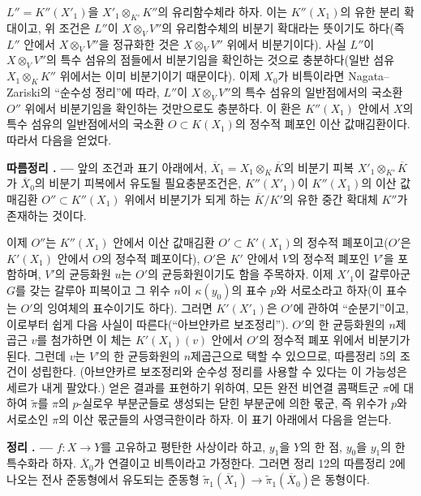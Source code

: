 \documentclass[11pt,twoside,openany]{book}
\numberwithin{equation}{section}
\newcommand{\sourceunit}{front}
\newcommand{\src}[1]{%
  \phantomsection\hypertarget{src:\sourceunit:#1}{}%
  \marginpar{\raggedleft\footnotesize\sffamily #1}%
}
\theoremstyle{plain}
\theoremstyle{definition}
\theoremstyle{remark}
\newcommand{\result}[2]{%
  \par\medskip\noindent\textbf{#1%
  \if\relax\detokenize{#2}\relax\else\space#2\fi. ---}\enspace
}
\begin{document}
$L''=K''(X'_1)$을 $X'_1\otimes_{K'}K''$의 유리함수체라 하자. 이는
$K''(X_1)$의 유한 분리 확대이고, 위 조건은 $L''$이
$X\otimes_VV''$의 유리함수체의 비분기 확대라는 뜻이기도 하다(즉
$L''$ 안에서 $X\otimes_VV''$을 정규화한 것은 $X\otimes_VV''$ 위에서
비분기이다). 사실 $L''$이 $X\otimes_VV''$의 특수 섬유의 점들에서
비분기임을 확인하는 것으로 충분하다(일반 섬유
$X_1\otimes_KK''$ 위에서는 이미 비분기이기 때문이다). 이제 $X_0$가
비특이라면 Nagata--Zariski의 ``순수성 정리''에 따라, $L''$이
$X\otimes_VV''$의 특수 섬유의 일반점에서의 국소환 $O''$ 위에서
비분기임을 확인하는 것만으로도 충분하다. 이 환은
$K''(X_1)$ 안에서 $X$의 특수 섬유의 일반점에서의 국소환
$O\subset K(X_1)$의 정수적 폐포인 이산 값매김환이다. 따라서 다음을
얻었다.

\src{218}
\result{따름정리}{5} 앞의 조건과 표기 아래에서,
$\overline X_1=X_1\otimes_K\overline K$의 비분기 피복
$X'_1\otimes_{K'}\overline K$가 $\overline X_0$의 비분기 피복에서
유도될 필요충분조건은, $K''(X'_1)$이
$K''(X_1)$의 이산 값매김환 $O''\subset K''(X_1)$ 위에서 비분기가
되게 하는 $\overline K/K'$의 유한 중간 확대체 $K''$가 존재하는 것이다.

이제 $O''$는 $K''(X_1)$ 안에서 이산 값매김환
$O'\subset K'(X_1)$의 정수적 폐포이고($O'$은 $K'(X_1)$ 안에서
$O$의 정수적 폐포이다), $O'$은 $K'$ 안에서 $V$의 정수적 폐포인
$V'$을 포함하며, $V'$의 균등화원 $u$는 $O'$의 균등화원이기도 함을
주목하자. 이제 $X'_1$이 갈루아군 $G$를 갖는 갈루아 피복이고 그 위수
$n$이 $\kappa(y_0)$의 표수 $p$와 서로소라고 하자(이 표수는 $O'$의
잉여체의 표수이기도 하다). 그러면 $K'(X'_1)$은 $O'$에 관하여
``순분기''이고, 이로부터 쉽게 다음 사실이 따른다(``아브얀카르
보조정리''). $O'$의 한 균등화원의 $n$제곱근 $v$를 첨가하면 이 체는
$K'(X_1)(v)$ 안에서 $O'$의 정수적 폐포 위에서 비분기가 된다. 그런데
$v$는 $V'$의 한 균등화원의 $n$제곱근으로 택할 수 있으므로,
따름정리 5의 조건이 성립한다. (아브얀카르 보조정리와 순수성 정리를
사용할 수 있다는 이 가능성은 세르가 내게 팔았다.) 얻은 결과를
표현하기 위하여, 모든 완전 비연결 콤팩트군 $\pi$에 대하여
$\widetilde\pi$를 $\pi$의 $p$-실로우 부분군들로 생성되는 닫힌 부분군에
의한 몫군, 즉 위수가 $p$와 서로소인 $\pi$의 이산 몫군들의 사영극한이라
하자. 이 표기 아래에서 다음을 얻는다.

\result{정리}{13} $f:X\longrightarrow Y$를 고유하고 평탄한 사상이라
하고, $y_1$을 $Y$의 한 점, $y_0$을 $y_1$의 한 특수화라 하자.
$\overline X_0$가 연결이고 비특이라고 가정한다. 그러면 정리 12의
따름정리 2에 나오는 전사 준동형에서 유도되는 준동형
$\widetilde\pi_1(\overline X_1)\longrightarrow
\widetilde\pi_1(\overline X_0)$은 동형이다.
\end{document}

